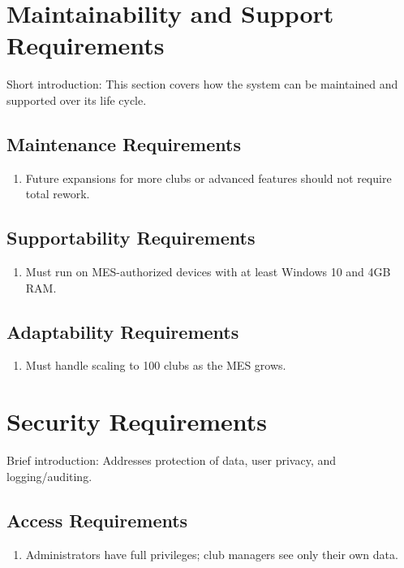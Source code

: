 \documentclass[12pt]{article}
\begin{document}
\section{Maintainability and Support Requirements}
Short introduction: This section covers how the system can be maintained and supported over its life cycle.

\subsection{Maintenance Requirements}
\begin{enumerate}
  \item Future expansions for more clubs or advanced features should not require total rework.
\end{enumerate}

\subsection{Supportability Requirements}
\begin{enumerate}
  \item Must run on MES-authorized devices with at least Windows 10 and 4GB RAM.
\end{enumerate}

\subsection{Adaptability Requirements}
\begin{enumerate}
  \item Must handle scaling to 100 clubs as the MES grows.
\end{enumerate}

\section{Security Requirements}
Brief introduction: Addresses protection of data, user privacy, and logging/auditing.

\subsection{Access Requirements}
\begin{enumerate}
  \item Administrators have full privileges; club managers see only their own data.
\end{enumerate}
\end{document}
